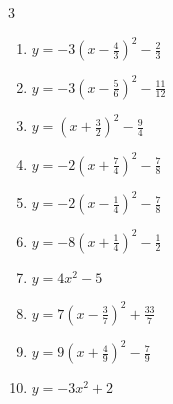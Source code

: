 \begin{multicols}{3}
\begin{enumerate}
  \item $\displaystyle y=-3\left( x-\frac{4}{3}\right)^{2}-\frac{2}{3}$


  \item $\displaystyle y=-3\left( x-\frac{5}{6}\right)^{2}-\frac{11}{12}$


  \item $\displaystyle y=\left( x+\frac{3}{2}\right)^{2}-\frac{9}{4}$


  \item $\displaystyle y=-2\left( x+\frac{7}{4}\right)^{2}-\frac{7}{8}$


  \item $\displaystyle y=-2\left( x-\frac{1}{4}\right)^{2}-\frac{7}{8}$


  \item $\displaystyle y=-8\left( x+\frac{1}{4}\right)^{2}-\frac{1}{2}$


  \item $\displaystyle y=4x^{2}-5$

        \phantom{$\displaystyle 頂点\left( 0 , -5 \right)$}

\columnbreak %

  \item $\displaystyle y=7\left( x-\frac{3}{7}\right)^{2}+\frac{33}{7}$


  \item $\displaystyle y=9\left( x+\frac{4}{9}\right)^{2}-\frac{7}{9}$


  \item $\displaystyle y=-3x^{2}+2$

        \phantom{$\displaystyle 頂点\left( 0 , 2 \right)$}


\end{enumerate}
\end{multicols}
